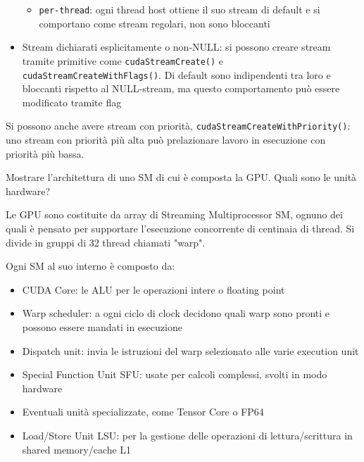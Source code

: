 \begin{questions}
\begin{solution}
\begin{itemize}
\begin{itemize}
                \item \texttt{per-thread}: ogni thread host ottiene il suo stream di default e si comportano come stream regolari, non sono bloccanti
            \end{itemize}
            
            \item Stream dichiarati esplicitamente o non-NULL: si possono creare stream tramite primitive come \texttt{cudaStreamCreate()} e \texttt{cudaStreamCreateWithFlags()}. Di default sono indipendenti tra loro e bloccanti rispetto al NULL-stream, ma questo comportamento può essere modificato tramite flag
        \end{itemize}
        
        Si possono anche avere stream con priorità, \texttt{cudaStreamCreateWithPriority()}: uno stream con priorità più alta può prelazionare lavoro in esecuzione con priorità più bassa.
    \end{solution}
    
    \question Mostrare l'architettura di uno SM di cui è composta la GPU. Quali sono le unità hardware?
    
    \begin{solution}
        Le GPU sono costituite da array di Streaming Multiprocessor SM, ognuno dei quali è pensato per supportare l'esecuzione concorrente di centinaia di thread. Si divide in gruppi di 32 thread chiamati "warp".
        
        Ogni SM al suo interno è composto da: 
        \begin{itemize}
            \item CUDA Core: le ALU per le operazioni intere o floating point
            
            \item Warp scheduler: a ogni ciclo di clock decidono quali warp sono pronti e possono essere mandati in esecuzione
            
            \item Dispatch unit: invia le istruzioni del warp selezionato alle varie execution unit
            
            \item Special Function Unit SFU: usate per calcoli complessi, svolti in modo hardware
            
            \item Eventuali unità specializzate, come Tensor Core o FP64
            
            \item Load/Store Unit LSU: per la gestione delle operazioni di lettura/scrittura in shared memory/cache L1
            

\end{itemize}
\end{solution}
\end{questions}
